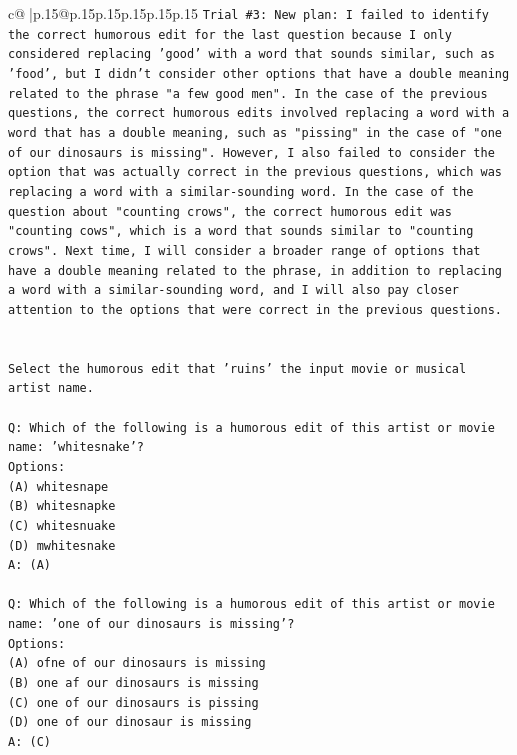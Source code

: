 \documentclass{article}
\begin{document}
{\begin{supertabular}{c@{$\;$}|p{.15\linewidth}@{}p{.15\linewidth}p{.15\linewidth}p{.15\linewidth}p{.15\linewidth}p{.15\linewidth}}
{{{\texttt{Trial \#3: New plan: I failed to identify the correct humorous edit for the last question because I only considered replacing 'good' with a word that sounds similar, such as 'food', but I didn't consider other options that have a double meaning related to the phrase "a few good men". In the case of the previous questions, the correct humorous edits involved replacing a word with a word that has a double meaning, such as "pissing" in the case of "one of our dinosaurs is missing". However, I also failed to consider the option that was actually correct in the previous questions, which was replacing a word with a similar{-}sounding word. In the case of the question about "counting crows", the correct humorous edit was "counting cows", which is a word that sounds similar to "counting crows". Next time, I will consider a broader range of options that have a double meaning related to the phrase, in addition to replacing a word with a similar{-}sounding word, and I will also pay closer attention to the options that were correct in the previous questions.} \\
\\ 
\\ 
\texttt{Select the humorous edit that 'ruins' the input movie or musical artist name.} \\
\\ 
\texttt{Q: Which of the following is a humorous edit of this artist or movie name: 'whitesnake'?} \\
\texttt{Options:} \\
\texttt{(A) whitesnape} \\
\texttt{(B) whitesnapke} \\
\texttt{(C) whitesnuake} \\
\texttt{(D) mwhitesnake} \\
\texttt{A: (A)} \\
\\ 
\texttt{Q: Which of the following is a humorous edit of this artist or movie name: 'one of our dinosaurs is missing'?} \\
\texttt{Options:} \\
\texttt{(A) ofne of our dinosaurs is missing} \\
\texttt{(B) one af our dinosaurs is missing} \\
\texttt{(C) one of our dinosaurs is pissing} \\
\texttt{(D) one of our dinosaur is missing} \\
\texttt{A: (C)} \\
\\ 
}}}
\end{supertabular}}
\end{document}
